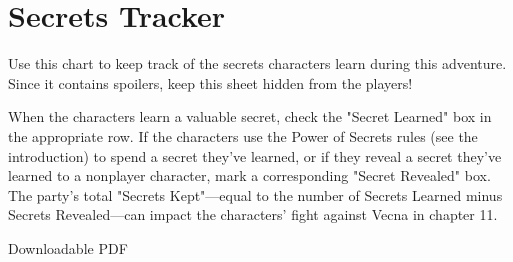 \documentclass[10pt,a4paper,twoside,bg=print,twocolumn,openany,nodeprecatedcode]{dndbook}
\begin{document}
\chapter{Secrets Tracker}
Use this chart to keep track of the secrets characters learn during this adventure. Since it contains spoilers, keep this sheet hidden from the players!

When the characters learn a valuable secret, check the "Secret Learned" box in the appropriate row. If the characters use the Power of Secrets rules (see the introduction) to spend a secret they've learned, or if they reveal a secret they've learned to a nonplayer character, mark a corresponding "Secret Revealed" box. The party's total "Secrets Kept"—equal to the number of Secrets Learned minus Secrets Revealed—can impact the characters' fight against Vecna in chapter 11.

Downloadable PDF
\end{document}
